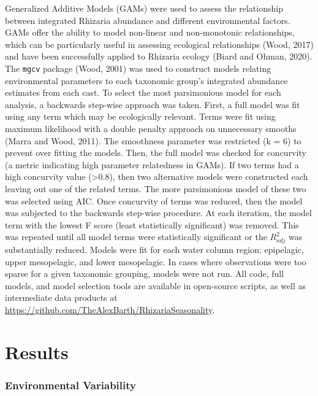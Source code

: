 \documentclass[
]{article}
\begin{document}
Generalized Additive Models (GAMs) were used to assess the relationship
between integrated Rhizaria abundance and different environmental
factors. GAMs offer the ability to model non-linear and non-monotonic
relationships, which can be particularly useful in assessing ecological
relationships (Wood, 2017) and have been successfully applied to
Rhizaria ecology (Biard and Ohman, 2020). The \texttt{mgcv} package
(Wood, 2001) was used to construct models relating environmental
parameters to each taxonomic group's integrated abundance estimates from
each cast. To select the most parsimonious model for each analysis, a
backwards step-wise approach was taken. First, a full model was fit
using any term which may be ecologically relevant. Terms were fit using
maximum likelihood with a double penalty approach on unnecessary smooths
(Marra and Wood, 2011). The smoothness parameter was restricted (k = 6)
to prevent over fitting the models. Then, the full model was checked for
concurvity (a metric indicating high parameter relatedness in GAMs). If
two terms had a high concurvity value (\textgreater0.8), then two
alternative models were constructed each leaving out one of the related
terms. The more parsimonious model of these two was selected using AIC.
Once concurvity of terms was reduced, then the model was subjected to
the backwards step-wise procedure. At each iteration, the model term
with the lowest F score (least statistically significant) was removed.
This was repeated until all model terms were statistically significant
or the \(R^2_{adj}\) was substantially reduced. Models were fit for each
water column region; epipelagic, upper mesopelagic, and lower
mesopelagic. In cases where observations were too sparse for a given
taxonomic grouping, models were not run. All code, full models, and
model selection tools are available in open-source scripts, as well as
intermediate data products at
\url{https://github.com/TheAlexBarth/RhizariaSeasonality}.

\hypertarget{results}{%
\section{Results}\label{results}}

\hypertarget{environmental-variability}{%
\subsubsection{Environmental
Variability}\label{environmental-variability}}
\end{document}
